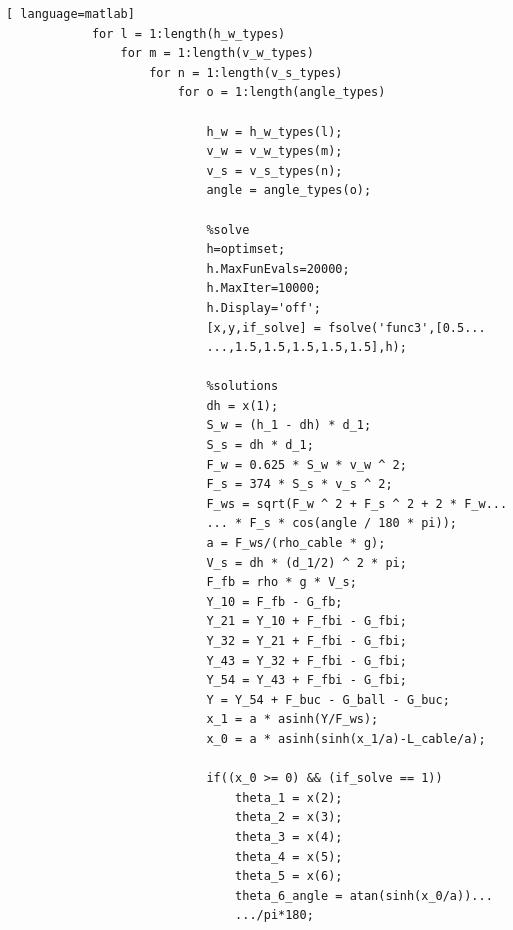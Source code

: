\documentclass[a4paper,12pt]{ctexart}
\begin{document}
\begin{footnotesize}
\begin{lstlisting}[ language=matlab]
            for l = 1:length(h_w_types)
                for m = 1:length(v_w_types)
                    for n = 1:length(v_s_types)
                        for o = 1:length(angle_types)

                            h_w = h_w_types(l);
                            v_w = v_w_types(m);
                            v_s = v_s_types(n);
                            angle = angle_types(o);

                            %solve
                            h=optimset;
                            h.MaxFunEvals=20000;
                            h.MaxIter=10000;
                            h.Display='off';
                            [x,y,if_solve] = fsolve('func3',[0.5...
                            ...,1.5,1.5,1.5,1.5,1.5],h);

                            %solutions
                            dh = x(1);
                            S_w = (h_1 - dh) * d_1;
                            S_s = dh * d_1;
                            F_w = 0.625 * S_w * v_w ^ 2;
                            F_s = 374 * S_s * v_s ^ 2;
                            F_ws = sqrt(F_w ^ 2 + F_s ^ 2 + 2 * F_w...
                            ... * F_s * cos(angle / 180 * pi));
                            a = F_ws/(rho_cable * g);
                            V_s = dh * (d_1/2) ^ 2 * pi;
                            F_fb = rho * g * V_s;
                            Y_10 = F_fb - G_fb;
                            Y_21 = Y_10 + F_fbi - G_fbi;
                            Y_32 = Y_21 + F_fbi - G_fbi;
                            Y_43 = Y_32 + F_fbi - G_fbi;
                            Y_54 = Y_43 + F_fbi - G_fbi;
                            Y = Y_54 + F_buc - G_ball - G_buc;
                            x_1 = a * asinh(Y/F_ws);
                            x_0 = a * asinh(sinh(x_1/a)-L_cable/a);

                            if((x_0 >= 0) && (if_solve == 1))
                                theta_1 = x(2);
                                theta_2 = x(3);
                                theta_3 = x(4);
                                theta_4 = x(5);
                                theta_5 = x(6);
                                theta_6_angle = atan(sinh(x_0/a))...
                                .../pi*180;


\end{lstlisting}
\end{footnotesize}
\end{document}
